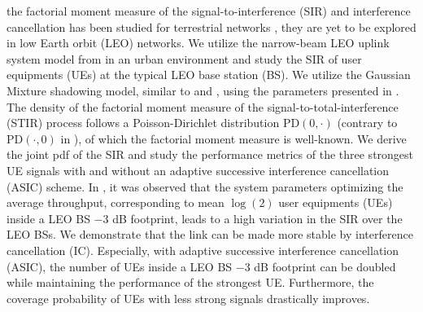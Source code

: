 \documentclass[lettersize,journal]{IEEEtran}
\begin{document}
 the factorial moment measure of the signal-to-interference (SIR)  and interference cancellation has been studied for terrestrial networks \cite{7305791}, they are yet to be explored in low Earth orbit (LEO) networks. We utilize the narrow-beam LEO uplink system model from \cite{10909705} in an urban environment and study the SIR of user equipments (UEs) at the typical LEO base station (BS). We utilize the Gaussian Mixture shadowing model, similar to \cite{modelinguplink} and \cite{9684552}, using the parameters presented in \cite{TR38.811}. The density of the factorial moment measure of the signal-to-total-interference (STIR) process follows a Poisson-Dirichlet distribution PD$(0,\cdot)$ (contrary to PD$(\cdot,0)$ in \cite{7305791}), of which the factorial moment measure is well-known. We derive the joint pdf of the SIR and study the performance metrics of the three strongest UE signals with and without an adaptive successive interference cancellation (ASIC) scheme. In \cite{10909705}, it was observed that the system parameters optimizing the average throughput, corresponding to mean $\log(2)$ user equipments (UEs) inside a LEO BS $-3$ dB footprint, leads to a high variation in the SIR over the LEO BSs. We demonstrate that the link can be made more stable by interference cancellation (IC). Especially, with adaptive successive interference cancellation (ASIC), the number of UEs inside a LEO BS $-3$ dB footprint can be doubled while maintaining the performance of the strongest UE. Furthermore, the coverage probability of UEs with less strong signals drastically improves.
\end{document}
